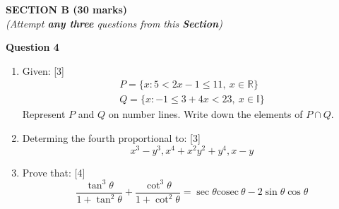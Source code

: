 \newpage
\begin{center}
   \large
   \textbf{SECTION B (30 marks)}\\
   \vspace{5mm}
   \normalsize
   \textit{(Attempt \textbf{any three} questions from this \textbf{Section})}
\end{center}
\par

\noindent
\textbf{Question 4}
\begin{enumerate}[label=(\roman*)]

    \item Given: \hfill [3]
        \[
            \begin{aligned}
            P = \{x:5 < 2x -1 \le 11, \ x \in \mathbb{R} \} \\
            Q = \{x:-1 \le 3 + 4x < 23, \ x \in \mathbb{I} \}
            \end{aligned}
        \]
        Represent $P$ and $Q$ on number lines. Write down the elements of 
        $P \cap Q$.

    \item Determing the fourth proportional to: \hfill [3]
        \[
            x^3 - y^3, x^4 + x^2y^2 + y^4, x-y
        \]

    \item Prove that: \hfill [4]
        \[
            \frac{\tan^3 \theta}{1 + \tan^2 \theta} + 
            \frac{\cot^3 \theta}{1 + \cot^2 \theta} = 
            \sec \theta \mathrm{cosec} \ \theta - 2 \sin \theta \cos \theta
        \]

\end{enumerate}

